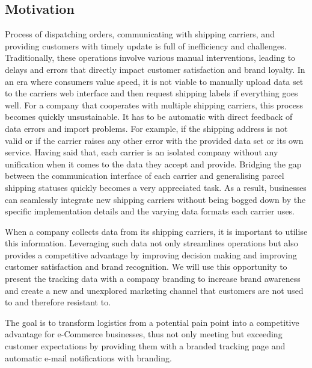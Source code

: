 \subsection*{Motivation}
\label{subsec:motivation}
Process of dispatching orders, communicating with shipping carriers, and providing customers with timely update is full of inefficiency and challenges.
Traditionally, these operations involve various manual interventions, leading to delays and errors that directly impact customer satisfaction and brand loyalty.
In an era where consumers value speed, it is not viable to manually upload data set to the carriers web interface and then request shipping labels if everything goes well. 
For a company that cooperates with multiple shipping carriers, this process becomes quickly unsustainable.
It has to be automatic with direct feedback of data errors and import problems. For example, if the shipping address is not valid or if the carrier raises any other error with the provided data set or its own service.
Having said that, each carrier is an isolated company without any unification when it comes to the data they accept and provide.
Bridging the gap between the communication interface of each carrier and generalising parcel shipping statuses quickly becomes a very appreciated task. 
As a result, businesses can seamlessly integrate new shipping carriers without being bogged down by the specific implementation details and the varying data formats each carrier uses.

When a company collects data from its shipping carriers, it is important to utilise this information.
Leveraging such data not only streamlines operations but also provides a competitive advantage by improving decision making and improving customer satisfaction and brand recognition.
We will use this opportunity to present the tracking data with a company branding to increase brand awareness and create a new and unexplored marketing channel that customers are not used to and therefore resistant to.

The goal is to transform logistics from a potential pain point into a competitive advantage for e-Commerce businesses, thus not only meeting but exceeding customer expectations by providing them with a branded tracking page and automatic e-mail notifications with branding.

